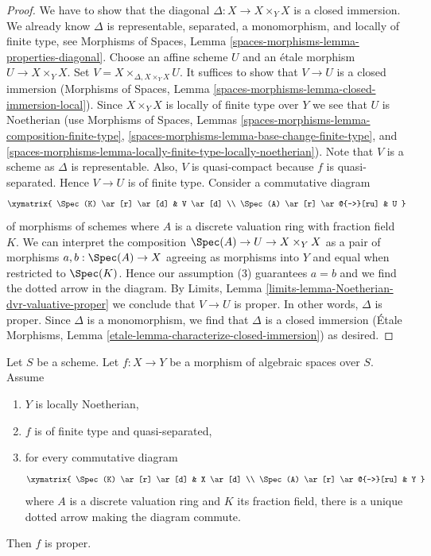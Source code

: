 \begin{proof}
We have to show that the diagonal $\Delta : X \to X \times_Y X$ is a closed
immersion. We already know $\Delta$ is representable, separated,
a monomorphism, and locally of finite type, see Morphisms of Spaces, Lemma
\ref{spaces-morphisms-lemma-properties-diagonal}.
Choose an affine scheme $U$ and an \'etale morphism
$U \to X \times_Y X$. Set $V = X \times_{\Delta, X \times_Y X} U$.
It suffices to show that $V \to U$ is a closed immersion
(Morphisms of Spaces, Lemma
\ref{spaces-morphisms-lemma-closed-immersion-local}).
Since $X \times_Y X$ is locally of finite type over $Y$ we see that
$U$ is Noetherian (use Morphisms of Spaces, Lemmas
\ref{spaces-morphisms-lemma-composition-finite-type},
\ref{spaces-morphisms-lemma-base-change-finite-type}, and
\ref{spaces-morphisms-lemma-locally-finite-type-locally-noetherian}).
Note that $V$ is a scheme as $\Delta$ is representable.
Also, $V$ is quasi-compact because $f$ is quasi-separated.
Hence $V \to U$ is of finite type. Consider a commutative diagram
$$
\xymatrix{
\Spec(K) \ar[r] \ar[d] & V \ar[d] \\
\Spec(A) \ar[r] \ar@{-->}[ru] & U
}
$$
of morphisms of schemes
where $A$ is a discrete valuation ring with fraction field $K$.
We can interpret the composition $\Spec(A) \to U \to X \times_Y X$
as a pair of morphisms $a, b : \Spec(A) \to X$ agreeing as morphisms
into $Y$ and equal when restricted to $\Spec(K)$. Hence our assumption
(3) guarantees $a = b$ and we find the dotted arrow in the diagram.
By Limits, Lemma \ref{limits-lemma-Noetherian-dvr-valuative-proper}
we conclude that $V \to U$ is proper. In other words, $\Delta$ is proper.
Since $\Delta$ is a monomorphism, we find that $\Delta$ is a
closed immersion (\'Etale Morphisms, Lemma
\ref{etale-lemma-characterize-closed-immersion}) as desired.
\end{proof}

\begin{lemma}
\label{lemma-check-proper-dvr}
Let $S$ be a scheme. Let $f : X \to Y$ be a morphism of algebraic
spaces over $S$. Assume
\begin{enumerate}
\item $Y$ is locally Noetherian,
\item $f$ is of finite type and quasi-separated,
\item for every commutative diagram
$$
\xymatrix{
\Spec(K) \ar[r] \ar[d] & X \ar[d] \\
\Spec(A) \ar[r] \ar@{-->}[ru] & Y
}
$$
where $A$ is a discrete valuation ring and $K$ its fraction field,
there is a unique dotted arrow making the diagram commute.
\end{enumerate}
Then $f$ is proper.
\end{lemma}

